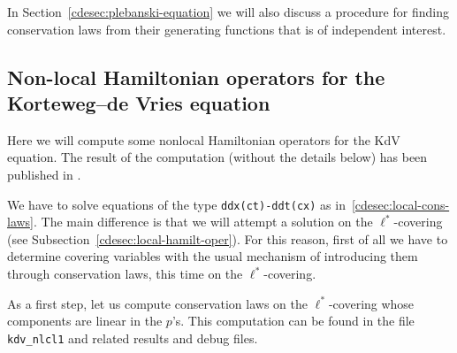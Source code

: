 In Section~\ref{cdesec:plebanski-equation} we will also discuss a procedure for
finding conservation laws from their generating functions that is of
independent interest.

\subsection{Non-local Hamiltonian operators for the
  Korteweg--de Vries equation}
\label{cdesec:korteweg-de-vries-1}

Here we will compute some nonlocal Hamiltonian operators for the KdV
equation. The result of the computation (without the details below) has been
published in \cite{KerstenKrasilshchikVerboretsky:2004}.

We have to solve equations of the type \texttt{ddx(ct)-ddt(cx)} as
in~\ref{cdesec:local-cons-laws}. The main difference is that we will attempt a
solution on the $\ell^*$-covering (see Subsection~\ref{cdesec:local-hamilt-oper}).
For this reason, first of all we have to determine covering variables with the
usual mechanism of introducing them through conservation laws, this time on the
$\ell^*$-covering.

As a first step, let us compute conservation laws on the $\ell^*$-covering
whose components are linear in the $p$'s.  This computation can be found in the
file \texttt{kdv\_nlcl1} and related results and debug files.

